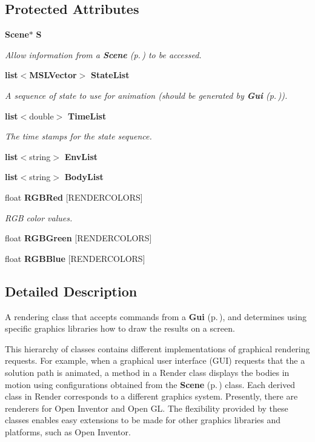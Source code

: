 \subsection*{Protected Attributes}
\begin{CompactItemize}
\item 
{\bf Scene}$\ast$ {\bf S}
\begin{CompactList}\small\item\em Allow information from a {\bf Scene} {\rm (p.\,\pageref{classScene})} to be accessed.\item\end{CompactList}\item 
{\bf list}$<${\bf MSLVector}$>$ {\bf State\-List}
\begin{CompactList}\small\item\em A sequence of state to use for animation (should be generated by {\bf Gui} {\rm (p.\,\pageref{classGui})}).\item\end{CompactList}\item 
{\bf list}$<$double$>$ {\bf Time\-List}
\begin{CompactList}\small\item\em The time stamps for the state sequence.\item\end{CompactList}\item 
{\bf list}$<$string$>$ {\bf Env\-List}
\item 
{\bf list}$<$string$>$ {\bf Body\-List}
\item 
float {\bf RGBRed} [RENDERCOLORS]
\begin{CompactList}\small\item\em RGB color values.\item\end{CompactList}\item 
float {\bf RGBGreen} [RENDERCOLORS]
\item 
float {\bf RGBBlue} [RENDERCOLORS]
\end{CompactItemize}


\subsection{Detailed Description}
A rendering class that accepts commands from a {\bf Gui} {\rm (p.\,\pageref{classGui})}, and determines using specific graphics libraries how to draw the results on a screen.

This hierarchy of classes contains different implementations of graphical rendering requests. For example, when a graphical user interface (GUI) requests that the a solution path is animated, a method in a Render class displays the bodies in motion using configurations obtained from the {\bf Scene} {\rm (p.\,\pageref{classScene})} class. Each derived class in Render corresponds to a different graphics system. Presently, there are renderers for Open Inventor and Open GL. The flexibility provided by these classes enables easy extensions to be made for other graphics libraries and platforms, such as Open Inventor.

